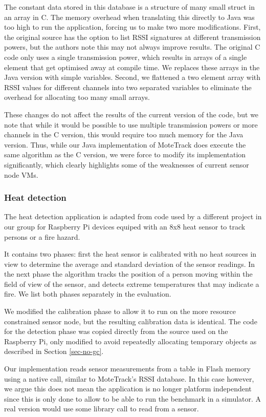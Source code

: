 The constant data stored in this database is a structure of many small struct in an array in C. The memory overhead when translating this directly to Java was too high to run the application, forcing us to make two more modifications. First, the original source has the option to list RSSI signatures at different transmission powers, but the authors note this may not always improve results. The original C code only uses a single transmission power, which results in arrays of a single element that get optimised away at compile time. We replaces these arrays in the Java version with simple variables. Second, we flattened a two element array with RSSI values for different channels into two separated variables to eliminate the overhead for allocating too many small arrays.

These changes do not affect the results of the current version of the code, but we note that while it would be possible to use multiple transmission powers or more channels in the C version, this would require too much memory for the Java version. Thus, while our Java implementation of MoteTrack does execute the same algorithm as the C version, we were force to modify its implementation significantly, which clearly highlights some of the weaknesses of current sensor node VMs.


\subsubsection{Heat detection}
The heat detection application is adapted from code used by a different project in our group for Raspberry Pi devices equiped with an 8x8 heat sensor to track persons or a fire hazard.

It contains two phases: first the heat sensor is calibrated with no heat sources in view to determine the average and standard deviation of the sensor readings. In the next phase the algorithm tracks the position of a person moving within the field of view of the sensor, and detects extreme temperatures that may indicate a fire. We list both phases separately in the evaluation.

We modified the calibration phase to allow it to run on the more resource constrained sensor node, but the resulting calibration data is identical. The code for the detection phase was copied directly from the source used on the Raspberry Pi, only modified to avoid repeatedly allocating temporary objects as described in Section \ref{sec-no-gc}.

Our implementation reads sensor measurements from a table in Flash memory using a native call, similar to MoteTrack's RSSI database. In this case however, we argue this does not mean the application is no longer platform independent since this is only done to allow to be able to run the benchmark in a simulator. A real version would use some library call to read from a sensor.


